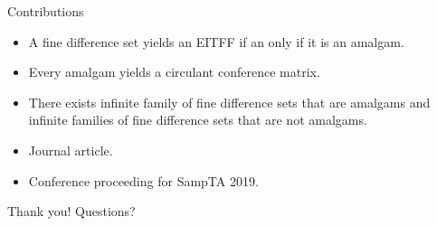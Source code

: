 \documentclass[12pt]{beamer}
\begin{document}
\begin{frame}{Contributions}
\begin{itemize}
    \item A fine difference set yields an EITFF if an only if it is an amalgam.
    
    \item Every amalgam yields a circulant conference matrix.
    
    \item There exists infinite family of fine difference sets that are amalgams and infinite families of fine difference sets that are not amalgams.
    
    \item Journal article.
    
    \item Conference proceeding for SampTA 2019.
\end{itemize}
\end{frame}

\begin{frame}
\begin{center}
    Thank you! Questions?
\end{center}

\end{frame}
\end{document}
